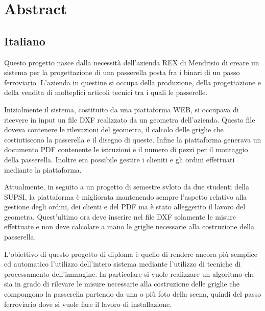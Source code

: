 \documentclass[twoside]{supsistudent}
\newcommand{\problemchapter}[1]{%
\chapter*{#1}%
\addcontentsline{toc}{chapter}{#1}%
\markboth{#1}{#1}
}
\begin{document}
\maketitle
\onehalfspacing
\frontmatter

\tableofcontents

\mainmatter %
\setcounter{page}{1}

\problemchapter{Abstract}
\section{Italiano}
Questo progetto nasce dalla necessità dell'azienda REX di Mendrisio di creare un sistema
per la progettazione di una passerella posta fra i binari di un passo ferroviario. L'azienda
in questine si occupa della produzione, della progettazione e della vendita di molteplici 
articoli tecnici tra i quali le passerelle. 

\bigskip
Inizialmente il sistema, costituito da una piattaforma WEB, si occupava di ricevere in input 
un file DXF realizzato da un geometra dell'azienda. Questo file doveva contenere le rilevazioni 
del geometra, il calcolo delle griglie che costiutiscono la passerella e il disegno di queste. 
Infine la piattaforma generava un documento PDF contenente le istruzioni e il numero di pezzi per 
il montaggio della passerella. Inoltre era possibile gestire i clieniti e gli ordini effettuati 
mediante la piattaforma. 

\bigskip
Attualmente, in seguito a un progetto di semestre svloto da due studenti della SUPSI, la piattaforma 
è migliorata mantenendo sempre l'aspetto relativo alla gestione degli ordini, dei clienti e del PDF 
ma è stato alleggerito il lavoro del geometra. Quest'ultimo ora deve inserire nel file DXF solamente 
le misure effettuate e non deve calcolare a mano le griglie necessarie alla costruzione della passerella.

\bigskip
L'obiettivo di questo progetto di diploma è quello di rendere ancora più semplice ed automatico l'utilizzo 
dell'intero sistema mediante l'utilizzo di tecniche di processamento dell'immagine. In particolare si 
vuole realizzare un algoritmo che sia in grado di rilevare le misure necessarie alla costruzione
delle griglie che compongono la passerella partendo da una o più foto della scena, quindi del passo 
ferroviario dove si vuole fare il lavoro di installazione.
\end{document}
